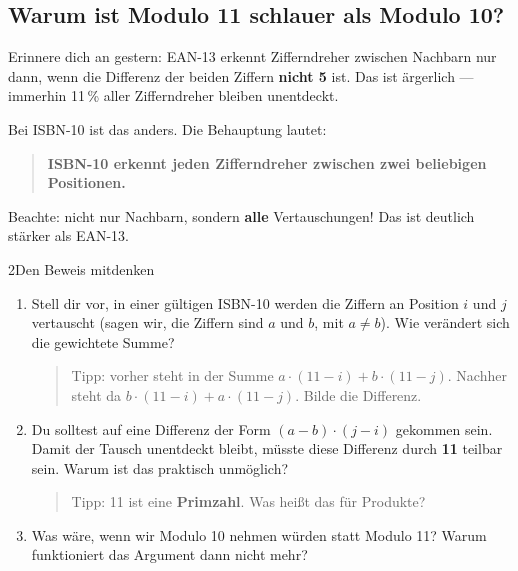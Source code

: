\subsection*{Warum ist Modulo 11 schlauer als Modulo 10?}

Erinnere dich an gestern: EAN-13 erkennt Zifferndreher zwischen
Nachbarn nur dann, wenn die Differenz der beiden Ziffern \textbf{nicht
5} ist. Das ist ärgerlich — immerhin 11\,\% aller Zifferndreher
bleiben unentdeckt.

Bei ISBN-10 ist das anders. Die Behauptung lautet:

\begin{quote}
\textbf{ISBN-10 erkennt jeden Zifferndreher zwischen zwei beliebigen
Positionen.}
\end{quote}

Beachte: nicht nur Nachbarn, sondern \textbf{alle} Vertauschungen!
Das ist deutlich stärker als EAN-13.

\begin{bleistiftuebung}{2}{Den Beweis mitdenken}
\begin{enumerate}[label=(\alph*), leftmargin=*]
\item Stell dir vor, in einer gültigen ISBN-10 werden die Ziffern an
  Position $i$ und $j$ vertauscht (sagen wir, die Ziffern sind $a$ und
  $b$, mit $a \ne b$). Wie verändert sich die gewichtete Summe?

  \begin{quote}
  Tipp: vorher steht in der Summe $a \cdot (11 - i) + b \cdot (11 - j)$.
  Nachher steht da $b \cdot (11 - i) + a \cdot (11 - j)$. Bilde die
  Differenz.
  \end{quote}

\item Du solltest auf eine Differenz der Form $(a - b) \cdot (j - i)$
  gekommen sein. Damit der Tausch unentdeckt bleibt, müsste diese
  Differenz durch \textbf{11} teilbar sein. Warum ist das praktisch
  unmöglich?

  \begin{quote}
  Tipp: 11 ist eine \textbf{Primzahl}. Was heißt das für Produkte?
  \end{quote}

\item Was wäre, wenn wir Modulo 10 nehmen würden statt Modulo 11?
  Warum funktioniert das Argument dann nicht mehr?
\end{enumerate}
\end{bleistiftuebung}

